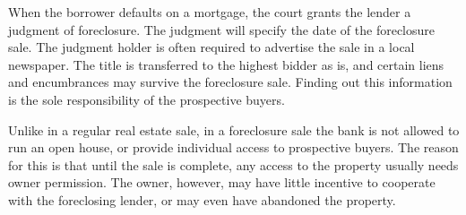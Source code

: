 \documentclass[11pt,twopage]{article}
\newcommand{\AN}[1]{\textcolor{red}{[AN: #1]}}
\begin{document}
When the borrower defaults on a mortgage, the court grants the lender a judgment of foreclosure.
The judgment will specify the date of the foreclosure
  sale. The judgment holder is often required to advertise  the sale in a local newspaper. The title is transferred to the highest bidder as is, and certain liens and encumbrances may survive the foreclosure sale. Finding out this information is the sole responsibility of the prospective buyers.
  
Unlike in a regular real estate sale, in a foreclosure sale the bank is not allowed to run an open house, or provide individual access to prospective buyers. The reason for this is that until the sale is complete, any access to the property usually needs owner permission. The owner, however, may have little incentive to cooperate with the foreclosing lender, or may even have abandoned the property.  
\end{document}

